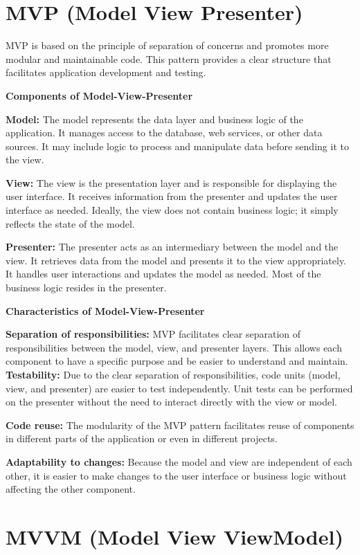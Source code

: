 \documentclass{article}
\begin{document}
\section{MVP (Model View Presenter)}
MVP is based on the principle of separation of concerns and promotes more modular and maintainable code. This pattern provides a clear structure that facilitates application development and testing.

\textbf{Components of Model-View-Presenter}

\textbf{Model:}
The model represents the data layer and business logic of the application.
It manages access to the database, web services, or other data sources.
It may include logic to process and manipulate data before sending it to the view.

\textbf{View:}
The view is the presentation layer and is responsible for displaying the user interface.
It receives information from the presenter and updates the user interface as needed.
Ideally, the view does not contain business logic; it simply reflects the state of the model.

\textbf{Presenter:}
The presenter acts as an intermediary between the model and the view.
It retrieves data from the model and presents it to the view appropriately.
It handles user interactions and updates the model as needed.
Most of the business logic resides in the presenter.

\textbf{Characteristics of Model-View-Presenter}

\textbf{Separation of responsibilities:}
MVP facilitates clear separation of responsibilities between the model, view, and presenter layers.
This allows each component to have a specific purpose and be easier to understand and maintain.
\textbf{Testability:}
Due to the clear separation of responsibilities, code units (model, view, and presenter) are easier to test independently.
Unit tests can be performed on the presenter without the need to interact directly with the view or model.

\textbf{Code reuse:}
The modularity of the MVP pattern facilitates reuse of components in different parts of the application or even in different projects.

\textbf{Adaptability to changes:}
Because the model and view are independent of each other, it is easier to make changes to the user interface or business logic without affecting the other component.

\section{MVVM (Model View ViewModel)}
\end{document}

